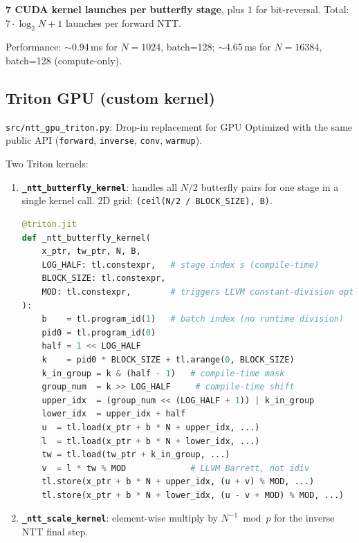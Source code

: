 \documentclass[11pt,a4paper]{article}
\begin{document}
\textbf{7 CUDA kernel launches per butterfly stage}, plus 1 for bit-reversal.
Total: $7 \cdot \log_2 N + 1$ launches per forward NTT.

Performance: $\sim$0.94\,ms for $N=1024$, batch=128; $\sim$4.65\,ms for $N=16384$,
batch=128 (compute-only).

\subsection{Triton GPU (custom kernel)}

\texttt{src/ntt\_gpu\_triton.py}: Drop-in replacement for GPU Optimized with the same
public API (\texttt{forward}, \texttt{inverse}, \texttt{conv}, \texttt{warmup}).

Two Triton kernels:

\begin{enumerate}
\item \textbf{\texttt{\_ntt\_butterfly\_kernel}}: handles all $N/2$ butterfly pairs
  for one stage in a single kernel call. 2D grid: \texttt{(ceil(N/2 / BLOCK\_SIZE), B)}.

\begin{lstlisting}[language=Python]
@triton.jit
def _ntt_butterfly_kernel(
    x_ptr, tw_ptr, N, B,
    LOG_HALF: tl.constexpr,   # stage index s (compile-time)
    BLOCK_SIZE: tl.constexpr,
    MOD: tl.constexpr,        # triggers LLVM constant-division opt
):
    b    = tl.program_id(1)   # batch index (no runtime division)
    pid0 = tl.program_id(0)
    half = 1 << LOG_HALF
    k    = pid0 * BLOCK_SIZE + tl.arange(0, BLOCK_SIZE)
    k_in_group = k & (half - 1)   # compile-time mask
    group_num  = k >> LOG_HALF     # compile-time shift
    upper_idx  = (group_num << (LOG_HALF + 1)) | k_in_group
    lower_idx  = upper_idx + half
    u  = tl.load(x_ptr + b * N + upper_idx, ...)
    l  = tl.load(x_ptr + b * N + lower_idx, ...)
    tw = tl.load(tw_ptr + k_in_group, ...)
    v  = l * tw % MOD             # LLVM Barrett, not idiv
    tl.store(x_ptr + b * N + upper_idx, (u + v) % MOD, ...)
    tl.store(x_ptr + b * N + lower_idx, (u - v + MOD) % MOD, ...)
\end{lstlisting}

\item \textbf{\texttt{\_ntt\_scale\_kernel}}: element-wise multiply by $N^{-1} \bmod p$
  for the inverse NTT final step.
\end{enumerate}
\end{document}
